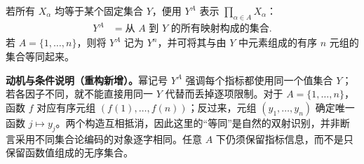 \documentclass[../../main.tex]{subfiles}%
\begin{document}

\begin{definition}[映射集合的幂记号]\label{definition:ch00-function-set-power}
若所有 $X_\alpha$ 均等于某个固定集合 $Y$，便用 $Y^A$ 表示 $\prod\limits_{\alpha\in A}X_\alpha$：
\begin{align*}
Y^A&=\text{从 }A\text{ 到 }Y\text{ 的所有映射构成的集合}.
\end{align*}
若 $A=\{1,\ldots,n\}$，则将 $Y^A$ 记为 $Y^n$，并可将其与由 $Y$ 中元素组成的有序 $n$ 元组的集合等同起来。
\end{definition}
\begin{remark}
\textbf{动机与条件说明（重构新增）。}幂记号 $Y^A$ 强调每个指标都使用同一个值集合 $Y$；若各因子不同，就不能直接用同一 $Y$ 代替而丢掉逐项限制。对于 $A=\{1,\ldots,n\}$，函数 $f$ 对应有序元组 $(f(1),\ldots,f(n))$；反过来，元组 $(y_1,\ldots,y_n)$ 确定唯一函数 $j\mapsto y_j$。两个构造互相抵消，因此这里的“等同”是自然的双射识别，并非断言采用不同集合论编码的对象逐字相同。任意 $A$ 下仍须保留指标信息，而不是只保留函数值组成的无序集合。
\end{remark}
\end{document}
